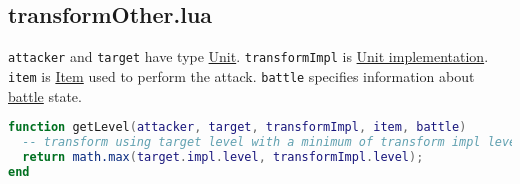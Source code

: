 \subsection{transformOther.lua}
\texttt{attacker} and \texttt{target} have type \hyperref[Unit]{Unit}. \texttt{transformImpl} is \hyperref[UnitImpl]{Unit implementation}. \texttt{item} is \hyperref[Item]{Item} used to perform the attack. \texttt{battle} specifies information about \hyperref[Battle]{battle} state.
\begin{center}
\begin{lstlisting}[language=Lua]
function getLevel(attacker, target, transformImpl, item, battle)
  -- transform using target level with a minimum of transform impl level
  return math.max(target.impl.level, transformImpl.level);
end
\end{lstlisting}
\end{center}